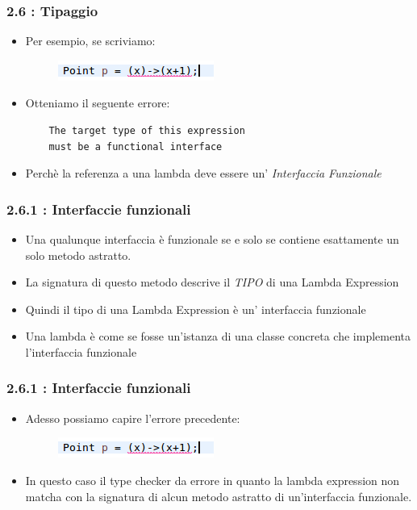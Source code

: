 \documentclass{beamer}
\begin{document}

\begin{frame}[fragile]
\frametitle{\textbf{2.6 : Tipaggio}}
\begin{itemize}
	\item Per esempio, se scriviamo:
	\begin{figure}
		\centering
		\includegraphics[width=0.3\linewidth]{image/target.png}
		\label{fig:target}
	\end{figure}
	\item Otteniamo il seguente errore:
	\begin{lstlisting}
	The target type of this expression
	must be a functional interface
	\end{lstlisting}
	\item Perchè la referenza a una lambda deve essere un' \emph{Interfaccia Funzionale}
\end{itemize}
\end{frame}


\begin{frame}
\frametitle{\textbf{2.6.1 : Interfaccie funzionali}}
\begin{itemize}
	\item Una qualunque interfaccia è funzionale se e solo se contiene esattamente un solo metodo astratto.
	\item La signatura di questo metodo descrive il \emph{TIPO} di una Lambda Expression
	\item Quindi il tipo di una Lambda Expression \`e un' interfaccia funzionale
	\item Una lambda è come se fosse un'istanza di una classe concreta che implementa l'interfaccia funzionale
\end{itemize}
\end{frame}


\begin{frame}
\frametitle{\textbf{2.6.1 : Interfaccie funzionali}}
\begin{itemize}
	\item Adesso possiamo capire l'errore precedente:
	\begin{figure}
		\centering
		\includegraphics[width=0.3\linewidth]{image/target.png}
		\label{fig:target}
	\end{figure}
	\item In questo caso il type checker da errore in quanto la lambda expression non matcha con la signatura di alcun metodo astratto di un'interfaccia funzionale.
\end{itemize}
\end{frame}
\end{document}
